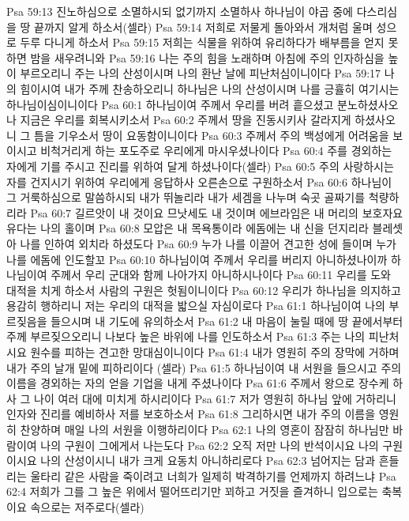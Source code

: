 Psa 59:13  진노하심으로 소멸하시되 없기까지 소멸하사 하나님이 야곱 중에 다스리심을 땅 끝까지 알게 하소서(셀라)
Psa 59:14  저희로 저물게 돌아와서 개처럼 울며 성으로 두루 다니게 하소서
Psa 59:15  저희는 식물을 위하여 유리하다가 배부름을 얻지 못하면 밤을 새우려니와
Psa 59:16  나는 주의 힘을 노래하며 아침에 주의 인자하심을 높이 부르오리니 주는 나의 산성이시며 나의 환난 날에 피난처심이니이다
Psa 59:17  나의 힘이시여 내가 주께 찬송하오리니 하나님은 나의 산성이시며 나를 긍휼히 여기시는 하나님이심이니이다
Psa 60:1  하나님이여 주께서 우리를 버려 흩으셨고 분노하셨사오나 지금은 우리를 회복시키소서
Psa 60:2  주께서 땅을 진동시키사 갈라지게 하셨사오니 그 틈을 기우소서 땅이 요동함이니이다
Psa 60:3  주께서 주의 백성에게 어려움을 보이시고 비척거리게 하는 포도주로 우리에게 마시우셨나이다
Psa 60:4  주를 경외하는 자에게 기를 주시고 진리를 위하여 달게 하셨나이다(셀라)
Psa 60:5  주의 사랑하시는 자를 건지시기 위하여 우리에게 응답하사 오른손으로 구원하소서
Psa 60:6  하나님이 그 거룩하심으로 말씀하시되 내가 뛰놀리라 내가 세겜을 나누며 숙곳 골짜기를 척량하리라
Psa 60:7  길르앗이 내 것이요 므낫세도 내 것이며 에브라임은 내 머리의 보호자요 유다는 나의 홀이며
Psa 60:8  모압은 내 목욕통이라 에돔에는 내 신을 던지리라 블레셋아 나를 인하여 외치라 하셨도다
Psa 60:9  누가 나를 이끌어 견고한 성에 들이며 누가 나를 에돔에 인도할꼬
Psa 60:10  하나님이여 주께서 우리를 버리지 아니하셨나이까 하나님이여 주께서 우리 군대와 함께 나아가지 아니하시나이다
Psa 60:11  우리를 도와 대적을 치게 하소서 사람의 구원은 헛됨이니이다
Psa 60:12  우리가 하나님을 의지하고 용감히 행하리니 저는 우리의 대적을 밟으실 자심이로다
Psa 61:1  하나님이여 나의 부르짖음을 들으시며 내 기도에 유의하소서
Psa 61:2  내 마음이 눌릴 때에 땅 끝에서부터 주께 부르짖으오리니 나보다 높은 바위에 나를 인도하소서
Psa 61:3  주는 나의 피난처시요 원수를 피하는 견고한 망대심이니이다
Psa 61:4  내가 영원히 주의 장막에 거하며 내가 주의 날개 밑에 피하리이다 (셀라)
Psa 61:5  하나님이여 내 서원을 들으시고 주의 이름을 경외하는 자의 얻을 기업을 내게 주셨나이다
Psa 61:6  주께서 왕으로 장수케 하사 그 나이 여러 대에 미치게 하시리이다
Psa 61:7  저가 영원히 하나님 앞에 거하리니 인자와 진리를 예비하사 저를 보호하소서
Psa 61:8  그리하시면 내가 주의 이름을 영원히 찬양하며 매일 나의 서원을 이행하리이다
Psa 62:1  나의 영혼이 잠잠히 하나님만 바람이여 나의 구원이 그에게서 나는도다
Psa 62:2  오직 저만 나의 반석이시요 나의 구원이시요 나의 산성이시니 내가 크게 요동치 아니하리로다
Psa 62:3  넘어지는 담과 흔들리는 울타리 같은 사람을 죽이려고 너희가 일제히 박격하기를 언제까지 하려느냐
Psa 62:4  저희가 그를 그 높은 위에서 떨어뜨리기만 꾀하고 거짓을 즐겨하니 입으로는 축복이요 속으로는 저주로다(셀라)
